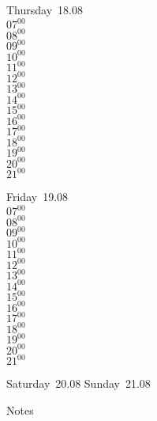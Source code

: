 \documentclass[11pt,a4paper]{book}\usepackage[]{graphicx}\usepackage[]{color}
\begin{document}
\clearpage
\begin{headerbox}
\end{headerbox}
\begin{weekdaybox}
  Thursday~18.08\\
  { 
  \vfill
  $07^{00}$\\
$08^{00}$\\
$09^{00}$\\
$10^{00}$\\
$11^{00}$\\
$12^{00}$\\
$13^{00}$\\
$14^{00}$\\
$15^{00}$\\
$16^{00}$\\
$17^{00}$\\
$18^{00}$\\
$19^{00}$\\
$20^{00}$\\
$21^{00}$\\
  }
\end{weekdaybox} 
\begin{weekdaybox}
  Friday~19.08\\
  { 
  \vfill
  $07^{00}$\\
$08^{00}$\\
$09^{00}$\\
$10^{00}$\\
$11^{00}$\\
$12^{00}$\\
$13^{00}$\\
$14^{00}$\\
$15^{00}$\\
$16^{00}$\\
$17^{00}$\\
$18^{00}$\\
$19^{00}$\\
$20^{00}$\\
$21^{00}$\\
  }
\end{weekdaybox}
\begin{weekendbox}
  Saturday~20.08
  \tcblower
  Sunday~21.08
\end{weekendbox} %
\begin{notebox}
  Notes
\end{notebox}
\clearpage
\end{document}
